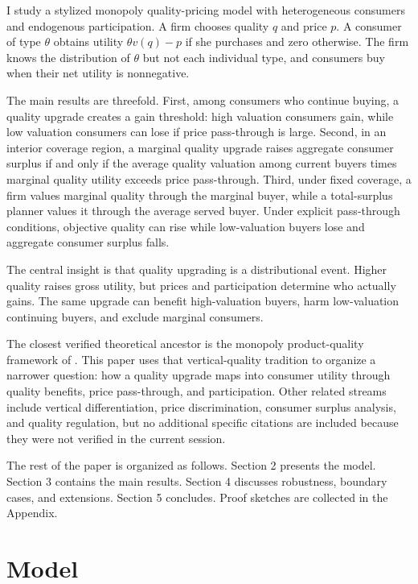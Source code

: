 \documentclass[12pt]{article}
\theoremstyle{plain}
\theoremstyle{definition}
\theoremstyle{remark}
\begin{document}
I study a stylized monopoly quality-pricing model with heterogeneous consumers and endogenous participation. A firm chooses quality $q$ and price $p$. A consumer of type $\theta$ obtains utility $\theta v(q)-p$ if she purchases and zero otherwise. The firm knows the distribution of $\theta$ but not each individual type, and consumers buy when their net utility is nonnegative.

The main results are threefold. First, among consumers who continue buying, a quality upgrade creates a gain threshold: high valuation consumers gain, while low valuation consumers can lose if price pass-through is large. Second, in an interior coverage region, a marginal quality upgrade raises aggregate consumer surplus if and only if the average quality valuation among current buyers times marginal quality utility exceeds price pass-through. Third, under fixed coverage, a firm values marginal quality through the marginal buyer, while a total-surplus planner values it through the average served buyer. Under explicit pass-through conditions, objective quality can rise while low-valuation buyers lose and aggregate consumer surplus falls.

The central insight is that quality upgrading is a distributional event. Higher quality raises gross utility, but prices and participation determine who actually gains. The same upgrade can benefit high-valuation buyers, harm low-valuation continuing buyers, and exclude marginal consumers.

The closest verified theoretical ancestor is the monopoly product-quality framework of \citet{MussaRosen1978}. This paper uses that vertical-quality tradition to organize a narrower question: how a quality upgrade maps into consumer utility through quality benefits, price pass-through, and participation. Other related streams include vertical differentiation, price discrimination, consumer surplus analysis, and quality regulation, but no additional specific citations are included because they were not verified in the current session.

The rest of the paper is organized as follows. Section 2 presents the model. Section 3 contains the main results. Section 4 discusses robustness, boundary cases, and extensions. Section 5 concludes. Proof sketches are collected in the Appendix.

\section{Model}
\end{document}
